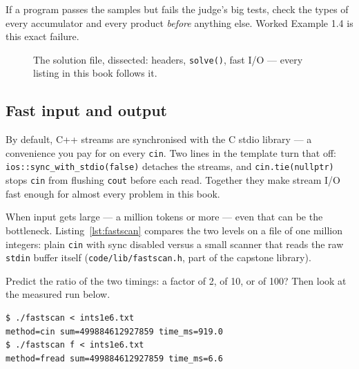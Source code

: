 \begin{tripwire}
If a program passes the samples but fails the judge's big tests, check the
types of every accumulator and every product \emph{before} anything else.
Worked Example 1.4 is this exact failure.
\end{tripwire}


\begin{figure}[htbp]\centering

\caption{The solution file, dissected: headers, \texttt{solve()}, fast I/O --- every listing in this book follows it.}
\label{fig:template}
\end{figure}

\subsection{Fast input and output}\label{sec:fastio}

By default, C++ streams are synchronised with the C stdio library --- a
convenience you pay for on every \texttt{cin}. Two lines in the template turn
that off: \texttt{ios::sync\_with\_stdio(false)} detaches the streams, and
\texttt{cin.tie(nullptr)} stops \texttt{cin} from flushing \texttt{cout}
before each read. Together they make stream I/O fast enough for almost every
problem in this book.

When input gets large --- a million tokens or more --- even that can be the
bottleneck. Listing~\ref{lst:fastscan} compares the two levels on a file of
one million integers: plain \texttt{cin} with sync disabled versus a small
scanner that reads the raw \texttt{stdin} buffer itself
(\texttt{code/lib/fastscan.h}, part of the capstone library).



\begin{checkpoint}
Predict the ratio of the two timings: a factor of 2, of 10, or of 100? Then
look at the measured run below.
\end{checkpoint}

\begin{lstlisting}[numbers=none]
$ ./fastscan < ints1e6.txt
method=cin sum=499884612927859 time_ms=919.0
$ ./fastscan f < ints1e6.txt
method=fread sum=499884612927859 time_ms=6.6
\end{lstlisting}

